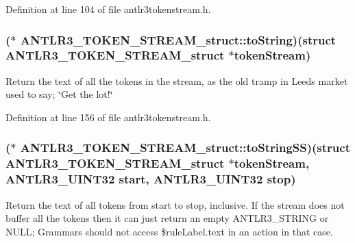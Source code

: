 Definition at line 104 of file antlr3tokenstream.\-h.

\hypertarget{struct_a_n_t_l_r3___t_o_k_e_n___s_t_r_e_a_m__struct_a73ad539fad9cf718632287c611046949}{
\subsubsection[{to\-String}]{($\ast$ A\-N\-T\-L\-R3\-\_\-\-T\-O\-K\-E\-N\-\_\-\-S\-T\-R\-E\-A\-M\-\_\-struct\-::to\-String)(struct {\bf A\-N\-T\-L\-R3\-\_\-\-T\-O\-K\-E\-N\-\_\-\-S\-T\-R\-E\-A\-M\-\_\-struct} $\ast$token\-Stream)}}\label{struct_a_n_t_l_r3___t_o_k_e_n___s_t_r_e_a_m__struct_a73ad539fad9cf718632287c611046949}
Return the text of all the tokens in the stream, as the old tramp in Leeds market used to say; \char`\"{}\-Get the lot!\char`\"{} 

Definition at line 156 of file antlr3tokenstream.\-h.

\hypertarget{struct_a_n_t_l_r3___t_o_k_e_n___s_t_r_e_a_m__struct_a19753e062fae1bc059a380338b3aff10}{
\subsubsection[{to\-String\-S\-S}]{($\ast$ A\-N\-T\-L\-R3\-\_\-\-T\-O\-K\-E\-N\-\_\-\-S\-T\-R\-E\-A\-M\-\_\-struct\-::to\-String\-S\-S)(struct {\bf A\-N\-T\-L\-R3\-\_\-\-T\-O\-K\-E\-N\-\_\-\-S\-T\-R\-E\-A\-M\-\_\-struct} $\ast$token\-Stream, {\bf A\-N\-T\-L\-R3\-\_\-\-U\-I\-N\-T32} start, {\bf A\-N\-T\-L\-R3\-\_\-\-U\-I\-N\-T32} stop)}}\label{struct_a_n_t_l_r3___t_o_k_e_n___s_t_r_e_a_m__struct_a19753e062fae1bc059a380338b3aff10}
Return the text of all tokens from start to stop, inclusive. If the stream does not buffer all the tokens then it can just return an empty A\-N\-T\-L\-R3\-\_\-\-S\-T\-R\-I\-N\-G or N\-U\-L\-L; Grammars should not access \$rule\-Label.\-text in an action in that case. 


